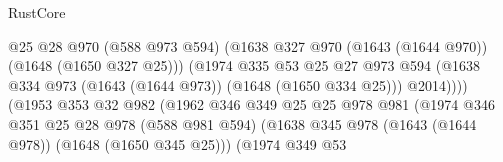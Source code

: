 \begin{lexlean}{RustCore}
\begin{coremodule}
                                              @25
                                              @28
                                              @970
                                              (@588 @973 @594)
                                              (@1638
                                                @327
                                                @970
                                                (@1643 (@1644 @970))
                                                (@1648 (@1650 @327 @25)))
                                              (@1974
                                                @335
                                                @53
                                                @25
                                                @27
                                                @973
                                                @594
                                                (@1638
                                                  @334
                                                  @973
                                                  (@1643 (@1644 @973))
                                                  (@1648 (@1650 @334 @25)))
                                                @2014))))
                                        (@1953
                                          @353
                                          @32
                                          @982
                                          (@1962
                                            @346
                                            @349
                                            @25
                                            @25
                                            @978
                                            @981
                                            (@1974
                                              @346
                                              @351
                                              @25
                                              @28
                                              @978
                                              (@588 @981 @594)
                                              (@1638
                                                @345
                                                @978
                                                (@1643 (@1644 @978))
                                                (@1648 (@1650 @345 @25)))
                                              (@1974
                                                @349
                                                @53

\end{coremodule}
\end{lexlean}
